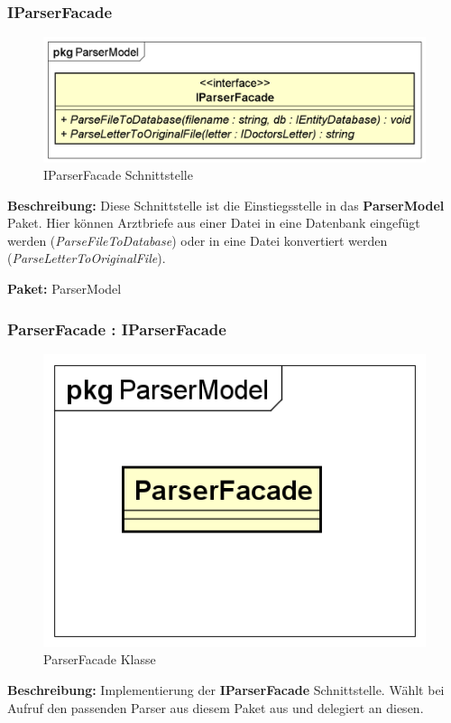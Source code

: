 \documentclass[a4paper]{scrreprt}
\begin{document}
\subsubsection{IParserFacade}
\begin{figure}[H]
\centering
\includegraphics[width=0.75\textheight]{graphics/Klassendiagramme/Model/IParserFacade.png}
\caption{IParserFacade Schnittstelle}
\end{figure}
\textbf{Beschreibung:} Diese Schnittstelle ist die Einstiegsstelle in das \textbf{ParserModel} Paket. 
Hier können Arztbriefe aus einer Datei in eine Datenbank eingefügt werden (\textit{ParseFileToDatabase}) oder in eine Datei konvertiert werden (\textit{ParseLetterToOriginalFile}).

\textbf{Paket:} ParserModel

\subsubsection{ParserFacade : IParserFacade}
\begin{figure}[H]
\centering
\includegraphics[width=0.45\textheight]{graphics/Klassendiagramme/Model/ParserFacade.png}
\caption{ParserFacade Klasse}
\end{figure}
\textbf{Beschreibung:} Implementierung der \textbf{IParserFacade} Schnittstelle. Wählt bei Aufruf den passenden Parser aus diesem Paket aus und delegiert an diesen.
\end{document}
